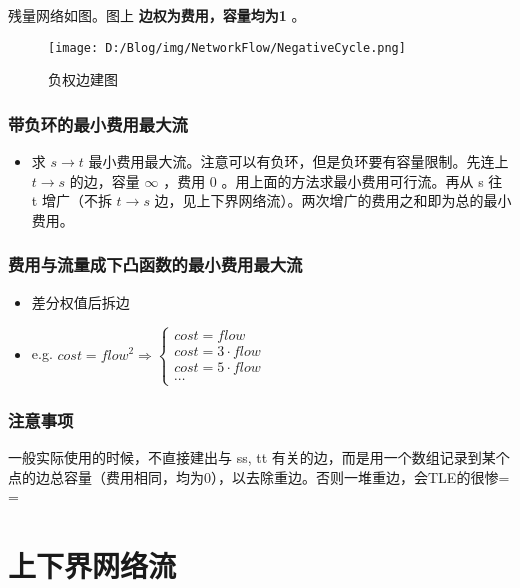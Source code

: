 \documentclass[]{ctexart}
\begin{document}
残量网络如图。图上 \textbf{边权为费用，容量均为1} 。
\begin{figure}
 \centering
 \texttt{[image: D:/Blog/img/NetworkFlow/NegativeCycle.png]}
 \caption{负权边建图}
\end{figure}

\hypertarget{header-n596}{%
\subsubsection{带负环的最小费用最大流}\label{header-n596}}

\begin{itemize}
\item
  求 \(s \rightarrow t\)
  最小费用最大流。注意可以有负环，但是负环要有容量限制。先连上
  \(t \rightarrow s\) 的边，容量 \(\infty\) ，费用 0
  。用上面的方法求最小费用可行流。再从 s 往 t 增广（不拆
  \(t \rightarrow s\)
  边，见上下界网络流）。两次增广的费用之和即为总的最小费用。
\end{itemize}

\hypertarget{header-n601}{%
\subsubsection{费用与流量成下凸函数的最小费用最大流}\label{header-n601}}

\begin{itemize}
\item
  差分权值后拆边
\item
  e.g.
  \(cost = flow^2 \Rightarrow \begin{cases}cost=flow \\ cost = 3\cdot flow \\ cost = 5 \cdot flow \\ \cdots\end{cases}\)
\end{itemize}

\hypertarget{header-n609}{%
\subsubsection{注意事项}\label{header-n609}}

一般实际使用的时候，不直接建出与 ss, tt
有关的边，而是用一个数组记录到某个点的边总容量（费用相同，均为0），以去除重边。否则一堆重边，会TLE的很惨=
=

\hypertarget{header-n613}{%
\section{上下界网络流}\label{header-n613}}
\end{document}
